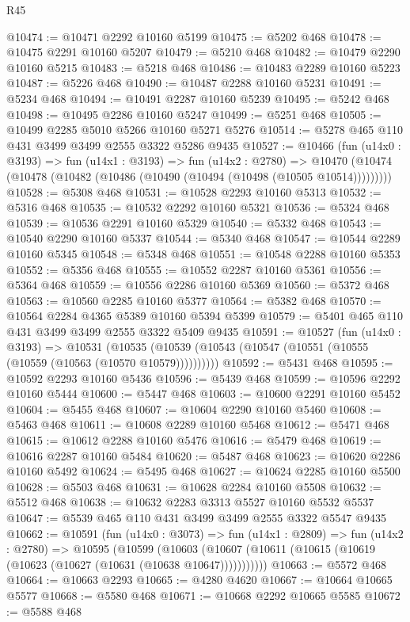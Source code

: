 \begin{lexlean}{R45}
\begin{coremodule}
@10474 := @10471 @2292 @10160 @5199
@10475 := @5202 @468
@10478 := @10475 @2291 @10160 @5207
@10479 := @5210 @468
@10482 := @10479 @2290 @10160 @5215
@10483 := @5218 @468
@10486 := @10483 @2289 @10160 @5223
@10487 := @5226 @468
@10490 := @10487 @2288 @10160 @5231
@10491 := @5234 @468
@10494 := @10491 @2287 @10160 @5239
@10495 := @5242 @468
@10498 := @10495 @2286 @10160 @5247
@10499 := @5251 @468
@10505 := @10499 @2285 @5010 @5266 @10160 @5271 @5276
@10514 := @5278 @465 @110 @431 @3499 @3499 @2555 @3322 @5286 @9435
@10527 := @10466
    (fun (u14x0 : @3193) =>
    fun (u14x1 : @3193) =>
    fun (u14x2 : @2780) =>
    @10470 (@10474 (@10478 (@10482 (@10486 (@10490 (@10494 (@10498 (@10505 @10514)))))))))
@10528 := @5308 @468
@10531 := @10528 @2293 @10160 @5313
@10532 := @5316 @468
@10535 := @10532 @2292 @10160 @5321
@10536 := @5324 @468
@10539 := @10536 @2291 @10160 @5329
@10540 := @5332 @468
@10543 := @10540 @2290 @10160 @5337
@10544 := @5340 @468
@10547 := @10544 @2289 @10160 @5345
@10548 := @5348 @468
@10551 := @10548 @2288 @10160 @5353
@10552 := @5356 @468
@10555 := @10552 @2287 @10160 @5361
@10556 := @5364 @468
@10559 := @10556 @2286 @10160 @5369
@10560 := @5372 @468
@10563 := @10560 @2285 @10160 @5377
@10564 := @5382 @468
@10570 := @10564 @2284 @4365 @5389 @10160 @5394 @5399
@10579 := @5401 @465 @110 @431 @3499 @3499 @2555 @3322 @5409 @9435
@10591 := @10527
    (fun (u14x0 : @3193) =>
    @10531 (@10535 (@10539 (@10543 (@10547 (@10551 (@10555 (@10559 (@10563 (@10570 @10579))))))))))
@10592 := @5431 @468
@10595 := @10592 @2293 @10160 @5436
@10596 := @5439 @468
@10599 := @10596 @2292 @10160 @5444
@10600 := @5447 @468
@10603 := @10600 @2291 @10160 @5452
@10604 := @5455 @468
@10607 := @10604 @2290 @10160 @5460
@10608 := @5463 @468
@10611 := @10608 @2289 @10160 @5468
@10612 := @5471 @468
@10615 := @10612 @2288 @10160 @5476
@10616 := @5479 @468
@10619 := @10616 @2287 @10160 @5484
@10620 := @5487 @468
@10623 := @10620 @2286 @10160 @5492
@10624 := @5495 @468
@10627 := @10624 @2285 @10160 @5500
@10628 := @5503 @468
@10631 := @10628 @2284 @10160 @5508
@10632 := @5512 @468
@10638 := @10632 @2283 @3313 @5527 @10160 @5532 @5537
@10647 := @5539 @465 @110 @431 @3499 @3499 @2555 @3322 @5547 @9435
@10662 := @10591
    (fun (u14x0 : @3073) =>
    fun (u14x1 : @2809) =>
    fun (u14x2 : @2780) =>
    @10595
      (@10599
        (@10603 (@10607 (@10611 (@10615 (@10619 (@10623 (@10627 (@10631 (@10638 @10647)))))))))))
@10663 := @5572 @468
@10664 := @10663 @2293
@10665 := @4280 @4620
@10667 := @10664 @10665 @5577
@10668 := @5580 @468
@10671 := @10668 @2292 @10665 @5585
@10672 := @5588 @468

\end{coremodule}
\end{lexlean}
